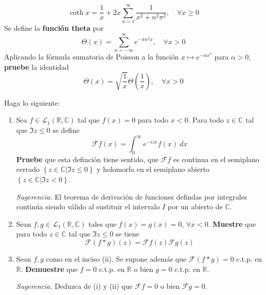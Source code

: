 \documentclass[12pt]{report}
\theoremstyle{largebreak}
\renewcommand{\leq}{\ensuremath{\leqslant}}
\renewcommand{\geq}{\ensuremath{\geqslant}}
\newcommand{\fou}[1]{\ensuremath{\mathcal{F}#1}}
\begin{document}
\begin{excer}
\begin{equation*}
            \coth x = \frac{1}{x}+2x\sum_{ n=1}^{\infty}\frac{1}{x^2+n^2\pi^2},\quad\forall x\geq0
        \end{equation*}
        Se define la \textbf{función theta} por
        \begin{equation*}
            \Theta(x)=\sum_{ n=-\infty}^{\infty}e^{ -\pi n^2x},\quad\forall x>0
        \end{equation*}
        Aplicando la fórmula sumatoria de Poisson a la función $x\mapsto e^{-\alpha x^2}$ para $\alpha>0$, \textbf{pruebe} la identidad
        \begin{equation*}
            \Theta(x)=\sqrt{\frac{1}{x}}\Theta\left(\frac{1}{x}\right),\quad\forall x>0
        \end{equation*}
    \end{excer}

    \begin{sol}
        
    \end{sol}

    \begin{excer}
        Haga lo siguiente:
        \begin{enumerate}
            \item Sea $f\in\mathcal{L}_1(\mathbb{R},\mathbb{C})$ tal que $f(x)=0$ para todo $x<0$. Para todo $z\in\mathbb{C}$ tal que $\Im z\leq 0$ se define
            \begin{equation*}
                \fou{f}(x)=\int_0^{\infty}e^{ -izx}f(x)\:dx
            \end{equation*}
            \textbf{Pruebe} que esta definción tiene sentido, que $\fou{f}$ es continua en el semiplano cerrado $\left\{z\in\mathbb{C}\Big|\Im z\leq0 \right\}$ y holomorfa en el semiplano abierto $\left\{z\in\mathbb{C}\Big|\Im z<0 \right\}$.

            \textit{Sugerencia.} El teorema de derivación de funciones defindas por integrales continúa siendo válido al sustituir el intervalo $I$ por un abierto de $\mathbb{C}$.

            \item Sean $f,g\in\mathcal{L}_1(\mathbb{R},\mathbb{C})$ tales que $f(x)=g(x)=0$, $\forall x<0$. \textbf{Muestre} que para todo $z\in\mathbb{C}$ tal que $\Im z\leq 0$ se tiene
            \begin{equation*}
                \fou{(f*g)}(z)=\fou{f}(z)\fou{g}(z)
            \end{equation*}
            \item Sean $f,g$ como en el inciso (ii). Se supone además que $\fou{(f*g)}=0$ c.t.p. en $\mathbb{R}$. \textbf{Demuestre} que $f=0$ c.t.p. en $\mathbb{R}$ o bien $g=0$ c.t.p. en $\mathbb{R}$.
            
            \textit{Sugerencia.} Deduzca de (i) y (ii) que $\fou{f}=0$ o bien $\fou{g}=0$.
        \end{enumerate}
    \end{excer}
\end{document}
